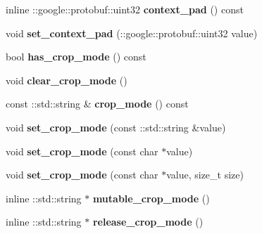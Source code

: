 \begin{DoxyCompactItemize}
inline \+::google\+::protobuf\+::uint32 {\bfseries context\+\_\+pad} () const
\item 
\mbox{\label{classcaffe_1_1_window_data_parameter_a41dccc8003d50d29d81505b1ba77802c}} 
void {\bfseries set\+\_\+context\+\_\+pad} (\+::google\+::protobuf\+::uint32 value)
\item 
\mbox{\label{classcaffe_1_1_window_data_parameter_a83ee0335a01ee6ec0e55f457c2a6bb9a}} 
bool {\bfseries has\+\_\+crop\+\_\+mode} () const
\item 
\mbox{\label{classcaffe_1_1_window_data_parameter_ae700b81ca3585f5b057c1fe5cd8ca959}} 
void {\bfseries clear\+\_\+crop\+\_\+mode} ()
\item 
\mbox{\label{classcaffe_1_1_window_data_parameter_a2b0a649cc7ee72b8c2364a1ef3e9e8bf}} 
const \+::std\+::string \& {\bfseries crop\+\_\+mode} () const
\item 
\mbox{\label{classcaffe_1_1_window_data_parameter_a188e18eb4664231a81982e97a91171a7}} 
void {\bfseries set\+\_\+crop\+\_\+mode} (const \+::std\+::string \&value)
\item 
\mbox{\label{classcaffe_1_1_window_data_parameter_aa566ad7261dd5a502b81c94430ef5364}} 
void {\bfseries set\+\_\+crop\+\_\+mode} (const char $\ast$value)
\item 
\mbox{\label{classcaffe_1_1_window_data_parameter_a4d0c86444a05c690a89dec36b50b6480}} 
void {\bfseries set\+\_\+crop\+\_\+mode} (const char $\ast$value, size\+\_\+t size)
\item 
\mbox{\label{classcaffe_1_1_window_data_parameter_a0721e318f03cd9abdf96d305d08d9226}} 
inline \+::std\+::string $\ast$ {\bfseries mutable\+\_\+crop\+\_\+mode} ()
\item 
\mbox{\label{classcaffe_1_1_window_data_parameter_a5e3f827de2c3156b83d1d51c4662bc9c}} 
inline \+::std\+::string $\ast$ {\bfseries release\+\_\+crop\+\_\+mode} ()

\end{DoxyCompactItemize}
